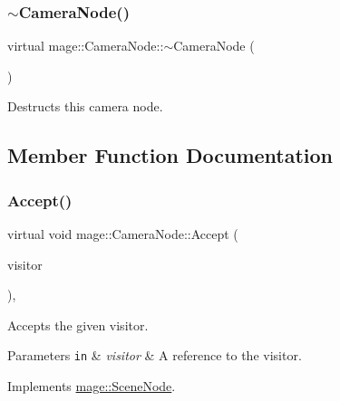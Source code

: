 \subsubsection{\texorpdfstring{$\sim$\+Camera\+Node()}{~CameraNode()}}
{\footnotesize\ttfamily virtual mage\+::\+Camera\+Node\+::$\sim$\+Camera\+Node (\begin{DoxyParamCaption}{ }\end{DoxyParamCaption})\hspace{0.3cm}{\ttfamily [virtual]}}

Destructs this camera node. 

\subsection{Member Function Documentation}
\hypertarget{classmage_1_1_camera_node_aed9c3c12cc4163fed880c49e43380efe}{}\label{classmage_1_1_camera_node_aed9c3c12cc4163fed880c49e43380efe} 
\subsubsection{\texorpdfstring{Accept()}{Accept()}\hspace{0.1cm}{\footnotesize\ttfamily [1/2]}}
{\footnotesize\ttfamily virtual void mage\+::\+Camera\+Node\+::\+Accept (\begin{DoxyParamCaption}\item[{\hyperlink{classmage_1_1_scene_node_visitor}{Scene\+Node\+Visitor} \&}]{visitor }\end{DoxyParamCaption})\hspace{0.3cm}{\ttfamily [override]}, {\ttfamily [virtual]}}

Accepts the given visitor.


\begin{DoxyParams}[1]{Parameters}
\mbox{\tt in}  & {\em visitor} & A reference to the visitor. \\
\hline
\end{DoxyParams}


Implements \hyperlink{classmage_1_1_scene_node_a32ed8763c8f8b4caa155f64551d96f13}{mage\+::\+Scene\+Node}.

\hypertarget{classmage_1_1_camera_node_a8b94f57b3a04f70b2c04a3d7c1ba3082}{}\label{classmage_1_1_camera_node_a8b94f57b3a04f70b2c04a3d7c1ba3082} 
